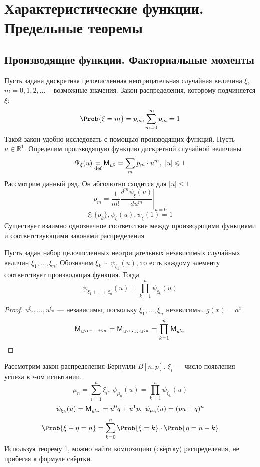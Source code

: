 \chapter{Характеристические функции. Предельные теоремы}
\setcounter{equation}{0}
\section{Производящие функции. Факториальные моменты}
Пусть задана дискретная целочисленная неотрицательная случайная величина $\xi$, $m = 0, 1, 2, \ldots$ – возможные значения. Закон распределения, которому подчиняется $\xi$: 
\[
	\Prob \{ \xi = m \} = p_m, \sum\limits_{m = 0}^{\infty} p_m = 1
\]
Такой закон удобно исследовать с помощью производящих функций. Пусть $u \in \mathbb{R}^1$. Определим производящую функцию дискретной случайной величины
\begin{equation}
	\Psi_{\xi} (u) \underset{\textrm{def} }{=} \mathsf{M}_{u^{\xi}} = \sum\limits_{m} p_m \cdot u^m, \ |u| \leqslant 1
\end{equation}
Рассмотрим данный ряд. Он абсолютно сходится для $|u| \leqslant 1$
\begin{equation}
	p_m = \frac{1}{m!} \left. \frac{d^m \psi_{\xi} (u)}{du^{m}} \right|_{u = 0}
\end{equation}
\[
	\xi : \{ p_k \}, \psi_{\xi} (u), \psi_{\xi}(1) = 1
\]
Существует взаимно однозначное соответствие между производящими функциями и соответствующими законами распределения
\begin{theorem}
	Пусть задан набор целочисленных неотрицательных независимых случайных величин $\xi_1, \ldots, \xi_n$. Обозначим $\xi_k \sim \psi_{\xi_k} (u)$, то есть каждому элементу соответствует производящая функция. Тогда
\[
	\psi_{\xi_1 + \ldots + \xi_n} (u) = \prod\limits_{k = 1}^{n} \psi_{\xi_k} (u)
\]
\end{theorem}
\begin{proof}
	$u^{\xi_1}, \ldots, u^{\xi_n}$ --- независимы, поскольку $\xi_1, \ldots, \xi_n$ независимы. $g(x) = a^x$
\[
	\mathsf{M}_{u^{\xi_1 + \ldots + \xi_n}} = \mathsf{M}_{u^{\xi_1} \cdot \ldots \cdot u^{\xi_n}} = \prod\limits_{k = 1}^{n} \mathsf{M}_{u^{\xi_k}}
\]
\end{proof}
\begin{example}
	Рассмотрим закон распределения Бернулли $B[n, p]$. $\xi_i$ --- число появления успеха в $i$-ом испытании.
\[
	\mu_n = \sum\limits_{i = 1}^{n} \xi_i, \ \psi_{\mu_n} (u) = \prod\limits_{k = 1}^{n} \psi_{\xi_k} (u)
\]
\[
	\psi_{\xi_k} (u) = \mathsf{M}_{u^{\xi_k}} = u^0 q + u^1 p, \ \psi_{\mu_n} (u) = (pu + q)^n
\]
\[
	\Prob \{ \xi + \eta = n \} = \sum\limits_{k = 0}^{n} \Prob \{ \xi = k \} \cdot \Prob \{ \eta = n - k \}
\]
Используя теорему 1, можно найти композицию (свёртку) распределения, не прибегая к формуле свёртки.
\end{example}
